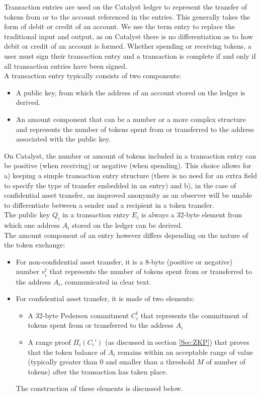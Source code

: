 Transaction entries are used on the Catalyst ledger to represent the transfer of tokens from or to the account referenced in the entries. This generally takes the form of debit or credit of an account. We use the term entry to replace the traditional input and output, as on Catalyst there is no differentiation as to how debit or credit of an account is formed. Whether spending or receiving tokens, a user must sign their transaction entry and a transaction is complete if and only if all transaction entries have been signed.\\

 A transaction entry typically consists of two components: 
 \begin{itemize}
\item A public key, from which the address of an account stored on the ledger is derived.
\item An amount component that can be a number or a more complex structure and represents the number of tokens spent from or transferred to the address associated with the public key.
\end{itemize}
On Catalyst, the number or amount of tokens included in a transaction entry can be positive (when receiving) or negative (when spending). This  choice allows for a) keeping a simple transaction entry structure (there is no need for an extra field to specify the type of transfer embedded in an entry) and b), in the case of confidential asset transfer, an improved anonymity as an observer will be unable to differentiate between a sender and a recipient in a token transfer. \\

The public key $Q_i$ in a transaction entry $E_i$ is always a 32-byte element from which one address $A_i$ stored on the ledger can be derived. \\

The amount component of an entry however differs depending on the nature of the token exchange:

\begin{itemize}
\item For non-confidential asset transfer, it is a 8-byte (positive or negative) number $v^t_i$ that represents the number of tokens spent from or transferred to the address $A_i$, communicated in clear text.
\item For confidential asset transfer, it is made of two elements: 
\begin{itemize}
\item A 32-byte Pedersen commitment $C_{i}^{t}$ that represents the commitment of tokens spent from or transferred to the address $A_i$ 
\item A range proof $\Pi_i(C_{i}')$ (as discussed in section \ref{Sec:ZKP}) that proves that the token balance of $A_i$ remains within an acceptable range of value (typically greater than 0 and smaller than a threshold $M$ of number of tokens) after the transaction has taken place.
\end{itemize}
 The construction of these elements is discussed below. 
\end{itemize}

